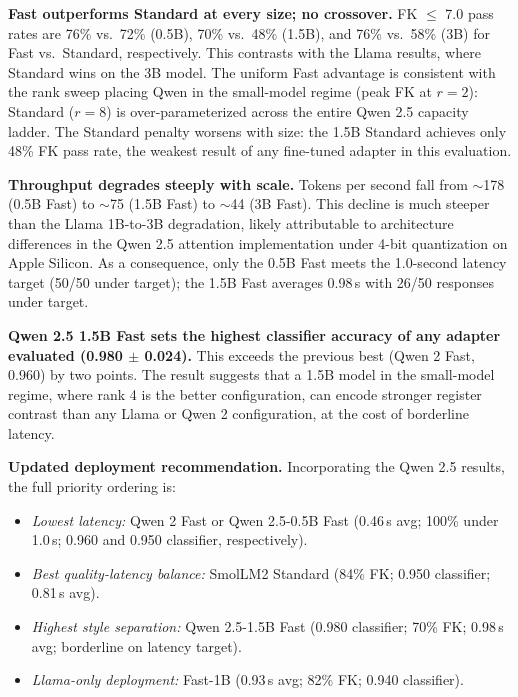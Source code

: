 \documentclass[ASNA,twocolumn]{USG} %
\begin{document}
\textbf{Fast outperforms Standard at every size; no crossover.} FK $\leq$ 7.0 pass rates are 76\% vs.\ 72\% (0.5B), 70\% vs.\ 48\% (1.5B), and 76\% vs.\ 58\% (3B) for Fast vs.\ Standard, respectively. This contrasts with the Llama results, where Standard wins on the 3B model. The uniform Fast advantage is consistent with the rank sweep placing Qwen in the small-model regime (peak FK at $r=2$): Standard ($r=8$) is over-parameterized across the entire Qwen 2.5 capacity ladder. The Standard penalty worsens with size: the 1.5B Standard achieves only 48\% FK pass rate, the weakest result of any fine-tuned adapter in this evaluation.

\textbf{Throughput degrades steeply with scale.} Tokens per second fall from $\sim$178 (0.5B Fast) to $\sim$75 (1.5B Fast) to $\sim$44 (3B Fast). This decline is much steeper than the Llama 1B-to-3B degradation, likely attributable to architecture differences in the Qwen 2.5 attention implementation under 4-bit quantization on Apple Silicon. As a consequence, only the 0.5B Fast meets the 1.0-second latency target (50/50 under target); the 1.5B Fast averages 0.98\,s with 26/50 responses under target.

\textbf{Qwen 2.5 1.5B Fast sets the highest classifier accuracy of any adapter evaluated (0.980 $\pm$ 0.024).} This exceeds the previous best (Qwen 2 Fast, 0.960) by two points. The result suggests that a 1.5B model in the small-model regime, where rank 4 is the better configuration, can encode stronger register contrast than any Llama or Qwen 2 configuration, at the cost of borderline latency.

\textbf{Updated deployment recommendation.} Incorporating the Qwen 2.5 results, the full priority ordering is:
\begin{itemize}
    \item \textit{Lowest latency:} Qwen 2 Fast or Qwen 2.5-0.5B Fast (0.46\,s avg; 100\% under 1.0\,s; 0.960 and 0.950 classifier, respectively).
    \item \textit{Best quality-latency balance:} SmolLM2 Standard (84\% FK; 0.950 classifier; 0.81\,s avg).
    \item \textit{Highest style separation:} Qwen 2.5-1.5B Fast (0.980 classifier; 70\% FK; 0.98\,s avg; borderline on latency target).
    \item \textit{Llama-only deployment:} Fast-1B (0.93\,s avg; 82\% FK; 0.940 classifier).
\end{itemize}
\end{document}

